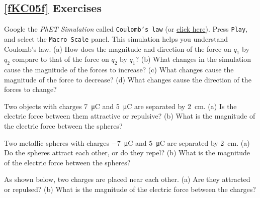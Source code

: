 \documentclass[main.tex]{subfiles}
\begin{document}
\cyanhrule

\subsection*{\ref{fKC05f} Exercises}

\begin{exercise}
    Google the \textit{PhET Simulation} called \texttt{Coulomb's law} (or \href{https://phet.colorado.edu/en/simulations/coulombs-law}{click here}). Press \texttt{Play}, and select the \texttt{Macro Scale} panel. This simulation helps you understand Coulomb's law. (a) How does the magnitude and direction of the force on $q_1$ by $q_2$ compare to that of the force on $q_2$ by $q_1$? (b) What changes in the simulation cause the magnitude of the forces to increase? (c) What changes cause the magnitude of the force to decrease? (d) What changes cause the direction of the forces to change?
\end{exercise}

\begin{exercise} \label{z4pMlx}
Two objects with charges \SI{7}{\micro C} and \SI{5}{\micro C} are separated by \SI{2}{cm}. (a) Is the electric force between them attractive or repulsive? (b) What is the magnitude of the electric force between the spheres?
\end{exercise}

\begin{exercise} \label{TPIAio}
    Two metallic spheres with charges \SI{-7}{\micro C} and \SI{5}{\micro C} are separated by \SI{2}{cm}. (a) Do the spheres attract each other, or do they repel? (b) What is the magnitude of the electric force between the spheres?
\end{exercise}

\begin{exercise} \label{mJu5SD}
    As shown below, two charges are placed near each other. (a) Are they attracted or repulsed? (b) What is the magnitude of the electric force between the charges?
    \vspace{-1em}
    
\begin{center}
\end{center}
\end{exercise}
\end{document}
